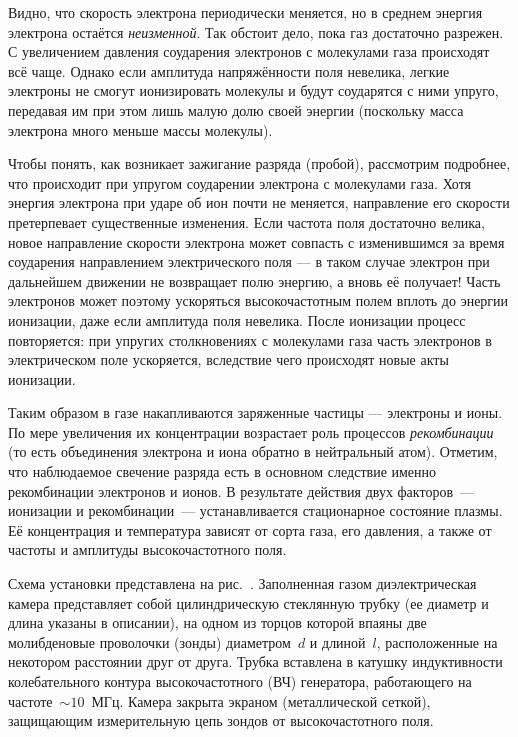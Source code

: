 Видно, что скорость электрона периодически меняется, 
но в среднем энергия электрона остаётся \emph{неизменной}. 
Так обстоит дело, пока газ достаточно разрежен. С увеличением
давления соударения электронов с молекулами газа происходят всё чаще.
Однако если амплитуда напряжённости поля невелика,
легкие электроны не смогут ионизировать молекулы 
и будут соударятся с ними упруго, передавая им при этом
лишь малую долю своей энергии (поскольку масса электрона
много меньше массы молекулы).

Чтобы понять, как возникает зажигание разряда (пробой), рассмотрим
подробнее, что происходит при упругом соударении электрона с молекулами газа. 
Хотя энергия электрона при ударе об ион почти не меняется, 
направление его скорости претерпевает существенные изменения.
Если частота поля достаточно велика, новое направление
скорости электрона может совпасть с изменившимся за время соударения направлением 
электрического поля --- в таком случае электрон при
дальнейшем движении не возвращает полю энергию, а вновь её получает! 
Часть
электронов может поэтому ускоряться высокочастотным полем вплоть
до энергии ионизации, даже если амплитуда поля невелика. 
После ионизации процесс повторяется: при упругих столкновениях с молекулами газа 
часть электронов в электрическом поле ускоряется, вследствие чего 
происходят новые акты ионизации. 

Таким образом в газе накапливаются заряженные частицы --- электроны и ионы. По мере
увеличения их концентрации возрастает роль процессов \emph{рекомбинации}
(то есть объединения электрона и иона обратно в нейтральный атом). 
Отметим, что наблюдаемое свечение разряда есть в основном следствие именно рекомбинации
электронов и ионов.
В результате
действия двух факторов~--- ионизации и рекомбинации~---
устанавливается стационарное состояние плазмы.
Её концентрация и температура зависят от сорта газа, его давления,
а также от частоты и амплитуды высокочастотного поля.


\experiment

Схема установки представлена на рис.~.
Заполненная газом диэлектрическая камера представляет собой цилиндрическую
стеклянную трубку (ее диаметр и длина указаны в описании), на одном из торцов
которой впаяны две молибденовые проволочки (зонды)
диаметром~$d$ и длиной~$l$, расположенные на некотором расстоянии друг от друга.
Трубка вставлена в катушку индуктивности колебательного контура высокочастотного 
(ВЧ) генератора, 
работающего на частоте~$\sim10$~МГц. 
Камера закрыта экраном (металлической сеткой), защищающим измерительную
цепь зондов от высокочастотного поля.

